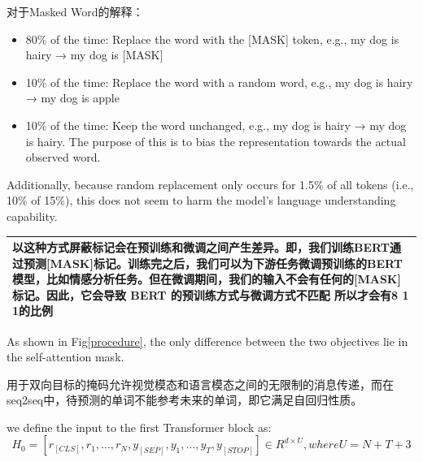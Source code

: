 \documentclass{article}
\begin{document}
\begin{sloppypar}
      对于Masked Word的解释\cite{devlin2019bert}：
      \begin{itemize}
            \item 80\% of the time: Replace the word with the [MASK] token, e.g., my dog is hairy → my dog is [MASK]
            \item 10\% of the time: Replace the word with a random word, e.g., my dog is hairy → my dog is apple
            \item 10\% of the time: Keep the word unchanged, e.g., my dog is hairy → my dog is hairy. The purpose of this is to bias the representation towards the actual observed word.
      \end{itemize}
      Additionally, because random replacement only occurs for 1.5\% of all tokens (i.e., 10\% of 15\%), this does not seem to harm the model’s language understanding capability.\cite{devlin2019bert}
      \begin{table}[!htbp]
            \renewcommand\arraystretch{2}

            \centering
            \begin{tabularx}{\textwidth}{|X|}
                  \hline

                  \indent 以这种方式屏蔽标记会在预训练和微调之间产生差异。即，我们训练BERT通过预测[MASK]标记。训练完之后，我们可以为下游任务微调预训练的BERT模型，比如情感分析任务。但在微调期间，我们的输入不会有任何的[MASK]标记。因此，它会导致 BERT 的预训练方式与微调方式不匹配
                  所以才会有8 1 1的比例 \\
                  \hline
            \end{tabularx}%
            \label{tab:addlabel}%

      \end{table}%



      As shown in Fig\ref{procedure}, the only difference between the two objectives lie in the self-attention mask.

      用于双向目标的掩码允许视觉模态和语言模态之间的无限制的消息传递，而在seq2seq中，待预测的单词不能参考未来的单词，即它满足自回归性质。

      we define the input to the first Transformer block as:
      \begin{equation}
            H_0 = [r_{[CLS]}, r_1, \dots, r_N, y_{[SEP]}, y_1, \dots, y_T, y_{[STOP]}] \in R^{d \times U},where U=N+T+3
            \label{auto-regressive}
      \end{equation}


\end{sloppypar}
\end{document}
